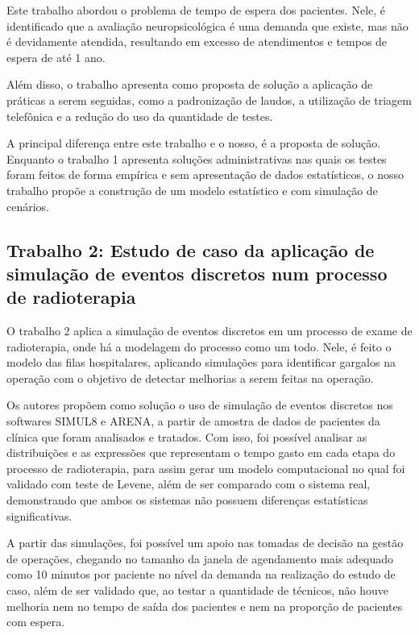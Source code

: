 \documentclass[
    12pt,                %
    openright,           %
    oneside,             %
    a4paper,             %
    english,             %
    brazil               %
]{abntex2}
\begin{document}
Este trabalho abordou o problema de tempo de espera dos pacientes. Nele, é identificado que a avaliação neuropsicológica é uma demanda que existe, mas não é devidamente atendida, resultando em excesso de atendimentos e tempos de espera de até 1 ano.

Além disso, o trabalho apresenta como proposta de solução a aplicação de práticas a serem seguidas, como a padronização de laudos, a utilização de triagem telefônica e a redução do uso da quantidade de testes.

A principal diferença entre este trabalho e o nosso, é a proposta de solução. Enquanto o trabalho 1 apresenta soluções administrativas nas quais os testes foram feitos de forma empírica e sem apresentação de dados estatísticos, o nosso trabalho propõe a construção de um modelo estatístico e com simulação de cenários.

\subsection{Trabalho 2: Estudo de caso da aplicação de simulação de eventos discretos num processo de radioterapia \cite{Galves2022}}

O trabalho 2 aplica a simulação de eventos discretos em um processo de exame de radioterapia, onde há a modelagem do processo como um todo. Nele, é feito o modelo das filas hospitalares, aplicando simulações para identificar gargalos na operação com o objetivo de detectar melhorias a serem feitas na operação.

Os autores propõem como solução o uso de simulação de eventos discretos nos softwares SIMUL8 e ARENA, a partir de amostra de dados de pacientes da clínica que foram analisados e tratados. Com isso, foi possível analisar as distribuições e as expressões que representam o tempo gasto em cada etapa do processo de radioterapia, para assim gerar um modelo computacional no qual foi validado com teste de Levene, além de ser comparado com o sistema real, demonstrando que ambos os sistemas não possuem diferenças estatísticas significativas.

A partir das simulações, foi possível um apoio nas tomadas de decisão na gestão de operações, chegando no tamanho da janela de agendamento mais adequado como 10 minutos por paciente no nível da demanda na realização do estudo de caso, além de ser validado que, ao testar a quantidade de técnicos, não houve melhoria nem no tempo de saída dos pacientes e nem na proporção de pacientes com espera.
\end{document}
